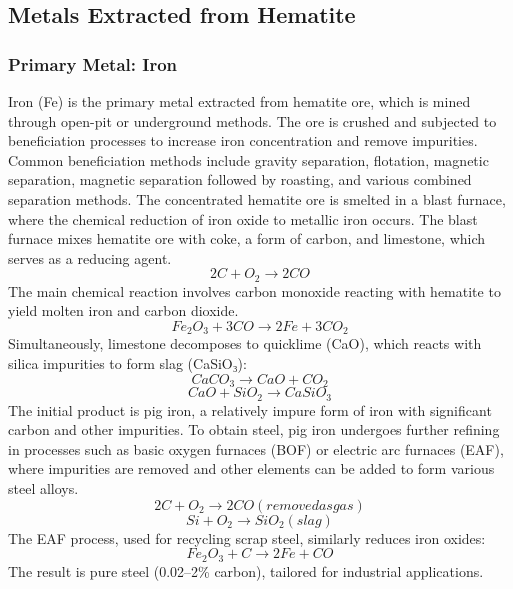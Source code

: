 \documentclass[12pt,a4paper, top=1.9cm, bottom=2.03cm, left=3.81cm, right=1.9cm]{article}
\begin{document}
\subsection{Metals Extracted from Hematite}
\subsubsection{Primary Metal: Iron}
\noindent\fontsize{12}{14}\selectfont Iron (Fe) is the primary metal extracted from hematite ore, which is mined through open-pit or underground methods. The ore is crushed and subjected to beneficiation processes to increase iron concentration and remove impurities. Common beneficiation methods include gravity separation, flotation, magnetic separation, magnetic separation followed by roasting, and various combined separation methods. The concentrated hematite ore is smelted in a blast furnace, where the chemical reduction of iron oxide to metallic iron occurs. The blast furnace mixes hematite ore with coke, a form of carbon, and limestone, which serves as a reducing agent.
\newpage
\[
2C + O_2 \rightarrow 2CO
\]
\noindent\fontsize{12}{14}\selectfont The main chemical reaction involves carbon monoxide reacting with hematite to yield molten iron and carbon dioxide.
\[ Fe_2O_3 + 3CO\rightarrow 2Fe +3CO_2 \]
\noindent\fontsize{12}{14}\selectfont Simultaneously, limestone decomposes to quicklime (CaO), which reacts with silica impurities to form slag (CaSiO₃):
\[CaCO_3→CaO+CO_2\]
\[CaO +SiO_2→CaSiO_3\]
\noindent\fontsize{12}{14}\selectfont The initial product is pig iron, a relatively impure form of iron with significant carbon and other impurities. To obtain steel, pig iron undergoes further refining in processes such as basic oxygen furnaces (BOF) or electric arc furnaces (EAF), where impurities are removed and other elements can be added to form various steel alloys.
\[2C+O_2→2CO (removed as gas)\]
\[Si+O_2→ SiO_2(slag)\]
\noindent\fontsize{12}{14}\selectfont The EAF process, used for recycling scrap steel, similarly reduces iron oxides:
\[Fe_2O_3+C→2Fe+CO\]
\noindent\fontsize{12}{14}\selectfont 
The result is pure steel (0.02–2\% carbon), tailored for industrial applications.
\end{document}

